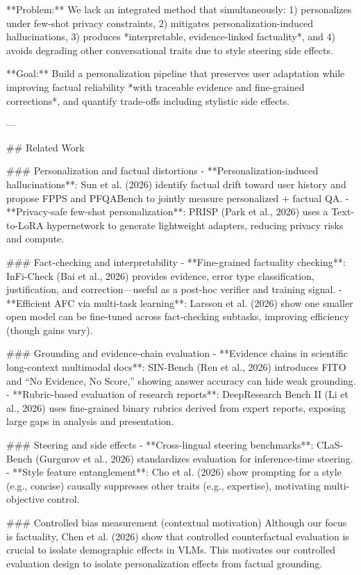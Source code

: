 **Problem:** We lack an integrated method that simultaneously:  
1) personalizes under few-shot privacy constraints,  
2) mitigates personalization-induced hallucinations,  
3) produces *interpretable, evidence-linked factuality*, and  
4) avoids degrading other conversational traits due to style steering side effects.

**Goal:** Build a personalization pipeline that preserves user adaptation while improving factual reliability *with traceable evidence and fine-grained corrections*, and quantify trade-offs including stylistic side effects.

---

## Related Work  

### Personalization and factual distortions  
- **Personalization-induced hallucinations**: Sun et al. (2026) identify factual drift toward user history and propose FPPS and PFQABench to jointly measure personalized + factual QA.  
- **Privacy-safe few-shot personalization**: PRISP (Park et al., 2026) uses a Text-to-LoRA hypernetwork to generate lightweight adapters, reducing privacy risks and compute.

### Fact-checking and interpretability  
- **Fine-grained factuality checking**: InFi-Check (Bai et al., 2026) provides evidence, error type classification, justification, and correction—useful as a post-hoc verifier and training signal.  
- **Efficient AFC via multi-task learning**: Larsson et al. (2026) show one smaller open model can be fine-tuned across fact-checking subtasks, improving efficiency (though gains vary).

### Grounding and evidence-chain evaluation  
- **Evidence chains in scientific long-context multimodal docs**: SIN-Bench (Ren et al., 2026) introduces FITO and “No Evidence, No Score,” showing answer accuracy can hide weak grounding.  
- **Rubric-based evaluation of research reports**: DeepResearch Bench II (Li et al., 2026) uses fine-grained binary rubrics derived from expert reports, exposing large gaps in analysis and presentation.

### Steering and side effects  
- **Cross-lingual steering benchmarks**: CLaS-Bench (Gurgurov et al., 2026) standardizes evaluation for inference-time steering.  
- **Style feature entanglement**: Cho et al. (2026) show prompting for a style (e.g., concise) causally suppresses other traits (e.g., expertise), motivating multi-objective control.

### Controlled bias measurement (contextual motivation)  
Although our focus is factuality, Chen et al. (2026) show that controlled counterfactual evaluation is crucial to isolate demographic effects in VLMs. This motivates our controlled evaluation design to isolate personalization effects from factual grounding.


